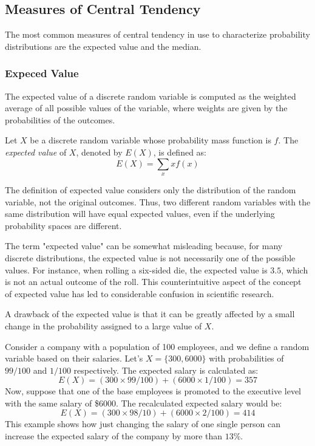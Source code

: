 \subsection{Measures of Central Tendency}

The most common measures of central tendency in use to characterize probability distributions are the expected value and the median.


\subsubsection*{Expeced Value}

The expected value of a discrete random variable is computed as the weighted average of all possible values of the variable, where weights are given by the probabilities of the outcomes.

\begin{definition}\label{probability:expectation}
Let $X$ be a discrete random variable whose probability mass function is $f$. The \emph{expected value} of $X$, denoted by $E\left(X\right)$, is defined as:
\[
E\left(X\right)=\sum_{x}xf\left(x\right)
\]
\end{definition}

The definition of expected value considers only the distribution of the random variable, not the original outcomes. Thus, two different random variables with the same distribution will have equal expected values, even if the underlying probability spaces are different.

The term "expected value" can be somewhat misleading because, for many discrete distributions, the expected value is not necessarily one of the possible values. For instance, when rolling a six-sided die, the expected value is \(3.5\), which is not an actual outcome of the roll. This counterintuitive aspect of the concept of expected value has led to considerable confusion in scientific research.

A drawback of the expected value is that it can be greatly affected by a small change in the probability assigned to a large value of $X$.

\begin{example}\label{ex:expected_salary}
Consider a company with a population of 100 employees, and we define a random variable based on their salaries. Let's $X = \{300, 6000\}$ with probabilities of $99/100$ and $1/100$ respectively. The expected salary is calculated as:
\[ 
E\left(X\right) = (300 \times 99/100) + (6000 \times 1/100) = 357
\]
Now, suppose that one of the base employees is promoted to the executive level with the same salary of \$6000. The recalculated expected salary would be:
\[
E\left(X\right) = (300 \times 98/10) + (6000 \times 2/100) = 414
\]
This example shows how just changing the salary of one single person can increase the expected salary of the company by more than $13\%$.
\end{example}

